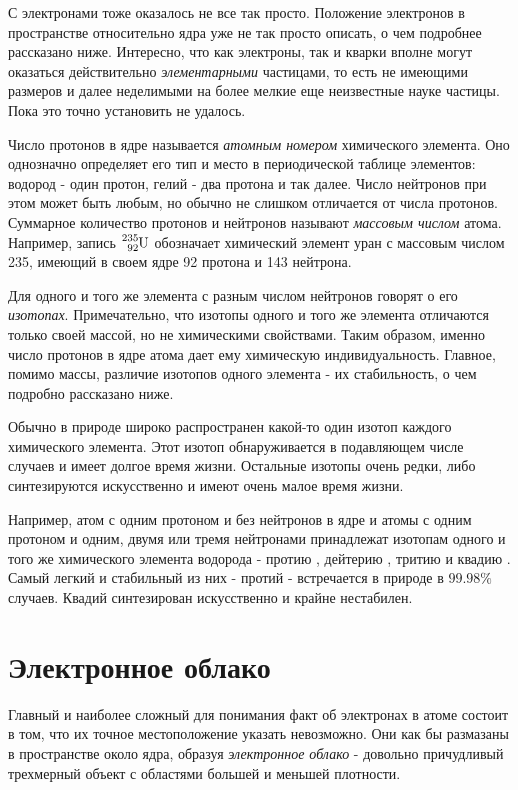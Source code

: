 С электронами тоже оказалось не все так просто.
Положение электронов в пространстве относительно ядра уже не так просто описать, о чем подробнее рассказано ниже.
Интересно, что как электроны, так и кварки вполне могут оказаться действительно \textit{элементарными} частицами, то есть не имеющими размеров и далее неделимыми на более мелкие еще неизвестные науке частицы.
Пока это точно установить не удалось.

Число протонов в ядре называется \textit{атомным номером} химического элемента.
Оно однозначно определяет его тип и место в периодической таблице элементов: водород - один протон, гелий - два протона и так далее.
Число нейтронов при этом может быть любым, но обычно не слишком отличается от числа протонов.
Суммарное количество протонов и нейтронов называют \textit{массовым числом} атома.
Например, запись $\ce{^{235}_{92}U}$ обозначает химический элемент уран с массовым числом 235, имеющий в своем ядре 92 протона и 143 нейтрона.

Для одного и того же элемента с разным числом нейтронов говорят о его \textit{изотопах}.
Примечательно, что изотопы одного и того же элемента отличаются только своей массой, но не химическими свойствами.
Таким образом, именно число протонов в ядре атома дает ему химическую индивидуальность.
Главное, помимо массы, различие изотопов одного элемента - их стабильность, о чем подробно рассказано ниже.

Обычно в природе широко распространен какой-то один изотоп каждого химического элемента.
Этот изотоп обнаруживается в подавляющем числе случаев и имеет долгое время жизни.
Остальные изотопы очень редки, либо синтезируются искусственно и имеют очень малое время жизни. 

Например, атом с одним протоном и без нейтронов в ядре и атомы с одним протоном и одним, двумя или тремя нейтронами принадлежат изотопам одного и того же химического элемента водорода - протию , дейтерию , тритию  и квадию .
Самый легкий и стабильный из них - протий - встречается в природе в $99.98\%$ случаев.
Квадий синтезирован искусственно и крайне нестабилен.


\section*{Электронное облако}

Главный и наиболее сложный для понимания факт об электронах в атоме состоит в том, что их точное местоположение указать невозможно.
Они как бы размазаны в пространстве около ядра, образуя \textit{электронное облако} - довольно причудливый трехмерный объект с областями большей и меньшей плотности.

